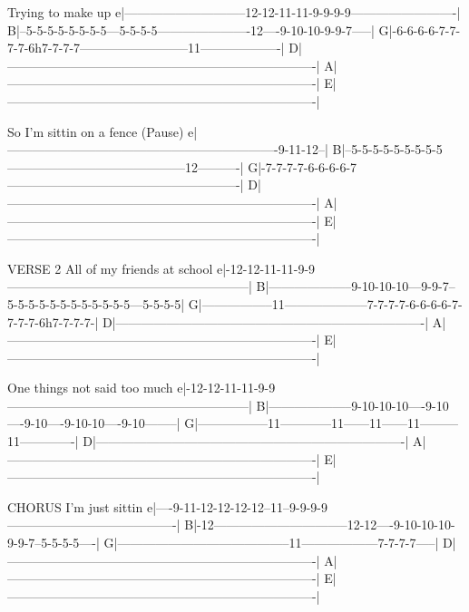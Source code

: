                               Trying to make up
e|-----------------------------12-12-11-11-9-9-9-9-------------------------|
B|--5-5-5-5-5-5-5-5---5-5-5-5----------------------12----9-10-10-9-9-7-----|
G|-6-6-6-6-7-7-7-7-6h7-7-7-7--------------------------11-------------------|
D|-------------------------------------------------------------------------|
A|-------------------------------------------------------------------------|
E|-------------------------------------------------------------------------|

   So I'm sittin on a fence  (Pause)
e|----------------------------------------------------------------9-11-12--|
B|--5-5-5-5-5-5-5-5-5------------------------------------------12----------|
G|-7-7-7-7-6-6-6-6-7-------------------------------------------------------|
D|-------------------------------------------------------------------------|
A|-------------------------------------------------------------------------|
E|-------------------------------------------------------------------------|

VERSE 2
   All of my friends at school
e|-12-12-11-11-9-9---------------------------------------------------------|
B|--------------------9-10-10-10---9-9-7--5-5-5-5-5-5-5-5-5-5-5-5---5-5-5-5|
G|-----------------11--------------------7-7-7-7-6-6-6-6-7-7-7-7-6h7-7-7-7-|
D|-------------------------------------------------------------------------|
A|-------------------------------------------------------------------------|
E|-------------------------------------------------------------------------|

   One things not said too much
e|-12-12-11-11-9-9---------------------------------------------------------|
B|--------------------9-10-10-10----9-10----9-10----9-10-10----9-10--------|
G|-----------------11------------11------11------11---------11-------------|
D|-------------------------------------------------------------------------|
A|-------------------------------------------------------------------------|
E|-------------------------------------------------------------------------|

CHORUS
               I'm just sittin
e|----9-11-12-12-12-12--11--9-9-9-9----------------------------------------|
B|-12--------------------------------12-12----9-10-10-10-9-9-7--5-5-5-5----|
G|-----------------------------------------11------------------7-7-7-7-----|
D|-------------------------------------------------------------------------|
A|-------------------------------------------------------------------------|
E|-------------------------------------------------------------------------|

